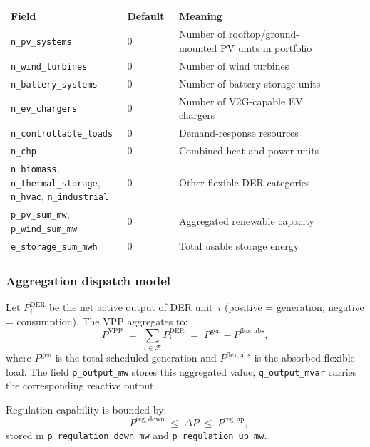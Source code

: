 \begin{longtable}{L{0.30\linewidth}L{0.15\linewidth}L{0.47\linewidth}}
\toprule
Field & Default & Meaning \\
\midrule
\endhead
\texttt{n\_pv\_systems} & 0 & Number of rooftop/ground-mounted PV units in portfolio \\
\texttt{n\_wind\_turbines} & 0 & Number of wind turbines \\
\texttt{n\_battery\_systems} & 0 & Number of battery storage units \\
\texttt{n\_ev\_chargers} & 0 & Number of V2G-capable EV chargers \\
\texttt{n\_controllable\_loads} & 0 & Demand-response resources \\
\texttt{n\_chp} & 0 & Combined heat-and-power units \\
\texttt{n\_biomass}, \texttt{n\_thermal\_storage}, \texttt{n\_hvac}, \texttt{n\_industrial} & 0 & Other flexible DER categories \\
\texttt{p\_pv\_sum\_mw}, \texttt{p\_wind\_sum\_mw} & 0 & Aggregated renewable capacity \\
\texttt{e\_storage\_sum\_mwh} & 0 & Total usable storage energy \\
\bottomrule
\end{longtable}

\subsubsection*{Aggregation dispatch model}

Let $P_i^{\mathrm{DER}}$ be the net active output of DER unit~$i$ (positive =
generation, negative = consumption).  The VPP aggregates to:
\begin{equation}
  P^{\mathrm{VPP}} \;=\; \sum_{i \in \mathcal{F}} P_i^{\mathrm{DER}}
  \;=\; P^{\mathrm{gen}} - P^{\mathrm{flex,abs}},
  \label{eq:vpp-agg}
\end{equation}
where $P^{\mathrm{gen}}$ is the total scheduled generation and
$P^{\mathrm{flex,abs}}$ is the absorbed flexible load.
The field \texttt{p\_output\_mw} stores this aggregated value;
\texttt{q\_output\_mvar} carries the corresponding reactive output.

Regulation capability is bounded by:
\begin{equation}
  -P^{\mathrm{reg,down}} \;\le\; \Delta P \;\le\; P^{\mathrm{reg,up}},
  \label{eq:vpp-reg}
\end{equation}
stored in \texttt{p\_regulation\_down\_mw} and \texttt{p\_regulation\_up\_mw}.

